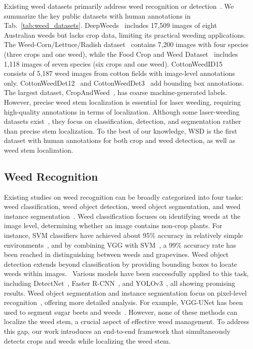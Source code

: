 Existing weed datasets primarily address weed recognition or detection~\cite{hasan2021survey, hu2024deep}. We summarize the key public datasets with human annotations in Tab.~\ref{tab:weed_datasets}. DeepWeeds~\cite{olsen2019deepweeds} includes 17,509 images of eight Australian weeds but lacks crop data, limiting its practical weeding applications. The Weed-Corn/Lettuce/Radish dataset~\cite{jiang2020cnn} contains 7,200 images with four species (three crops and one weed), while the Food Crop and Weed Dataset~\cite{sudars2020dataset} includes 1,118 images of seven species (six crops and one weed). CottonWeedID15~\cite{chen2022performance} consists of 5,187 weed images from cotton fields with image-level annotations only. CottonWeedDet12~\cite{lu2023cottonweeddet12} and CottonWeedDet3~\cite{rahman2023performance} add bounding box annotations. The largest dataset, CropAndWeed~\cite{steininger2023cropandweed}, has coarse machine-generated labels. However, precise weed stem localization is essential for laser weeding, requiring high-quality annotations in terms of localization. Although some laser-weeding datasets exist~\cite{zhang2024laser}, they focus on classification, detection, and segmentation rather than precise stem localization. To the best of our knowledge, WSD is the first dataset with human annotations for both crop and weed detection, as well as weed stem localization.

\subsection{Weed Recognition}
Existing studies on weed recognition can be broadly categorized into four tasks: weed classification, weed object detection, weed object segmentation, and weed instance segmentation~\cite{hu2024deep}. Weed classification focuses on identifying weeds at the image level, determining whether an image contains non-crop plants. For instance, SVM classifiers have achieved about 95\% accuracy in relatively simple environments~\cite{zhang2022segmentation}, and by combining VGG with 
SVM~\cite{tao2022hybrid}, a 99\% accuracy rate has been reached in distinguishing between weeds and grapevines. Weed object detection extends beyond classification by providing bounding boxes to locate weeds within images.~\cite{parra2020edge,nasiri2022deep} Various models have been successfully applied to this task, including DetectNet~\cite{yu2019weed}, Faster R-CNN~\cite{veeranampalayam2020comparison}, and YOLOv3~\cite{sharpe2020vegetation}, all showing promising results. Weed object segmentation and instance segmentation focus on pixel-level recognition~\cite{jeon2011robust, long2015fully, you2020dnn}, offering more detailed analysis. For example, VGG-UNet has been used to segment sugar beets and weeds~\cite{fawakherji2019uav}. 
However, none of these methods can localize the weed stem, a crucial aspect of effective weed management. To address this gap, our work introduces an end-to-end framework that simultaneously detects crops and weeds while localizing the weed stem.

